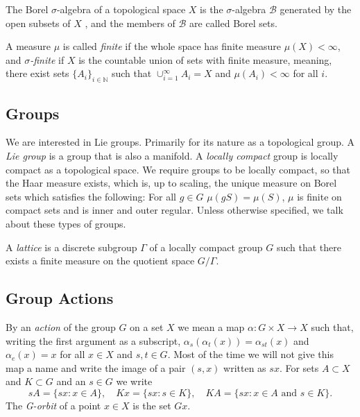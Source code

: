 \documentclass[
  12pt
]{article}
\theoremstyle{break}
\theoremstyle{plain}
\begin{document}
  The Borel $\sigma$-algebra of a topological space $X$ is the
  $\sigma$-algebra $\mathscr{B}$ generated by the open subsets of
  $X$ , and the members of $\mathscr{B}$ are called Borel sets. 

  A measure $\mu$ is called \emph{finite} if the whole space has finite measure $\mu(X) < \infty $,
  and \emph{$\sigma$-finite} if $X$ is the countable union of sets with finite measure,
  meaning, there exist sets $\{A_i\}_{i\in \mathbb{N}}$ such that $\cup_{i=1}^{\infty} A_i = X$ and
  $\mu(A_i) < \infty $ for all $i$.




  \hypertarget{groups}{%
  \subsection{Groups}\label{groups}}

  We are interested in Lie groups. Primarily for its nature as a topological group.
  A \emph{ Lie group } is a group that is also a manifold. A \emph{locally compact} group
  is locally compact as a topological space.
  We require groups to be locally compact, so that the Haar measure exists, which is, up to scaling,
  the unique measure on Borel sets which satisfies the following: For all $g\in G$
  $\mu(gS) = \mu(S)$, $\mu$ is finite on compact sets and is inner and outer
  regular.
  Unless otherwise specified, we talk about these types of groups.

  A \emph{lattice} is a discrete subgroup $\Gamma$ of a locally compact group $G$
  such that there exists a finite measure on the quotient space $G/\Gamma$.




  \hypertarget{group-actions}{
  \subsection{Group Actions}\label{group-actions}}

  By an \emph{action} of the group $G$ on a set $X$ we mean a
  map $\alpha: G \times X \rightarrow X$ such that, writing the first
  argument as a subscript, $\alpha_s(\alpha_t(x)) = \alpha_{st}(x)$ and
  $\alpha_e(x) = x$ for all $x \in X$ and $s, t \in G$.
  Most of the time we will not give this map a name and write the image of a pair
  $(s, x)$ written as $sx$. For sets $A \subset X$ and $K \subset G$
  and an $s \in G$ we write
  $$
  s A = \{sx : x \in A\},
  \quad
  K x = \{sx : s \in K \},
  \quad
  K A = \{sx : x \in A \text{ and } s \in K \}.
  $$
  The \emph{G-orbit} of a point $x \in X$ is the set $Gx$.
\end{document}
